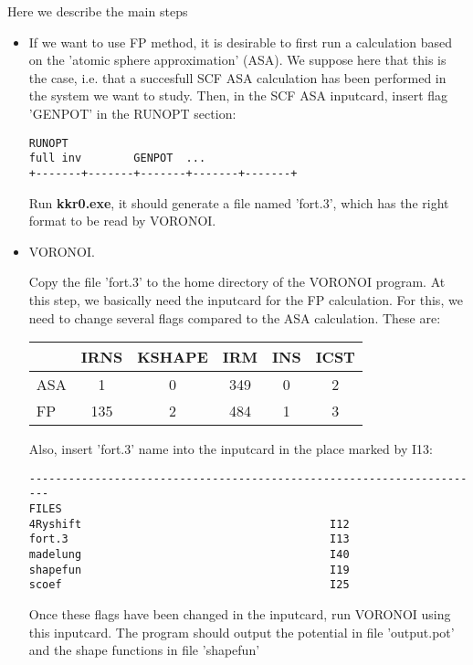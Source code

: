 \documentclass[11pt,fleqn]{book} %
\begin{document}
Here we describe the main steps

\begin{itemize}

\item If we want to use FP method, it is desirable to first run a calculation based on
the 'atomic sphere approximation' (ASA). We suppose here that
this is the case, i.e. that a succesfull SCF ASA calculation has been
performed in the system we want to study. Then, in the
SCF ASA inputcard, insert flag 'GENPOT' in the RUNOPT section:
\begin{VBox}
\begin{verbatim}
RUNOPT
full inv        GENPOT  ...
+-------+-------+-------+-------+-------+
\end{verbatim}
\end{VBox}

Run \textbf{kkr0.exe}, it should generate a file named
'fort.3', which has the right format to be read by VORONOI.

\item  VORONOI.

Copy the file 'fort.3' to the home directory of the VORONOI program.
At this step, we basically need the inputcard for the FP calculation.
For this, we need to change several flags compared to the ASA calculation.
These are:

\begin{tabular}{ l | c | c |  c | c | c}
      & IRNS & KSHAPE & IRM & INS & ICST \\
  \hline
  ASA & 1 & 0 & 349 & 0 & 2 \\
  FP  & 135 & 2 & 484 & 1 & 3 \\
\end{tabular}

Also, insert 'fort.3' name into the inputcard in the place marked
by I13:
\begin{VBox}
\begin{verbatim}
----------------------------------------------------------------------
FILES
4Ryshift                                      I12
fort.3                                        I13
madelung                                      I40
shapefun                                      I19
scoef                                         I25
\end{verbatim}
\end{VBox}

Once these flags have been changed in the inputcard,
run VORONOI using this inputcard. The program should output the potential
in file 'output.pot' and the shape functions in file 'shapefun'



\end{itemize}
\end{document}
